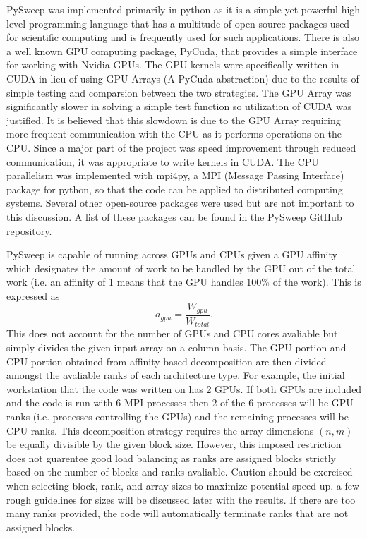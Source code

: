 \documentclass[review]{elsarticle}
\begin{document}
\par
PySweep was implemented primarily in python as it is a simple yet powerful high level programming language that has a multitude of open source packages used for scientific computing and is frequently used for such applications. There is also a well known GPU computing package, PyCuda, that provides a simple interface for working with Nvidia GPUs. The GPU kernels were specifically written in CUDA in lieu of using GPU Arrays (A PyCuda abstraction) due to the results of simple testing and comparsion between the two strategies. The GPU Array was significantly slower in solving a simple test function so utilization of CUDA was justified. It is believed that this slowdown is due to the GPU Array requiring more frequent communication with the CPU as it performs operations on the CPU. Since a major part of the project was speed improvement through reduced communication, it was appropriate to write kernels in CUDA. The CPU parallelism was implemented with mpi4py, a MPI (Message Passing Interface) package for python, so that the code can be applied to distributed computing systems. Several other open-source packages were used but are not important to this discussion. A list of these packages can be found in the PySweep GitHub repository.

\par
PySweep is capable of running across GPUs and CPUs given a GPU affinity which designates the amount of work to be handled by the GPU out of the total work (i.e. an affinity of 1 means that the GPU handles 100\% of the work). This is expressed as
\begin{equation}
    a_{gpu} = \frac{W_{gpu}}{W_{total}}.
\end{equation}
This does not account for the number of GPUs and CPU cores avaliable but simply divides the given input array on a column basis. The GPU portion and CPU portion obtained from affinity based decomposition are then divided amongst the avaliable ranks of each architecture type. For example, the initial workstation that the code was written on has 2 GPUs. If both GPUs are included and the code is run with 6 MPI processes then 2 of the 6 processes will be GPU ranks (i.e. processes controlling the GPUs) and the remaining processes will be CPU ranks. This decomposition strategy requires the array dimensions $(n, m)$ be equally divisible by the given block size. However, this imposed restriction does not guarentee good load balancing as ranks are assigned blocks strictly based on the number of blocks and ranks avaliable. Caution should be exercised when selecting block, rank, and array sizes to maximize potential speed up. a few rough guidelines for sizes will be discussed later with the results. If there are too many ranks provided, the code will automatically terminate ranks that are not assigned blocks.
\end{document}
